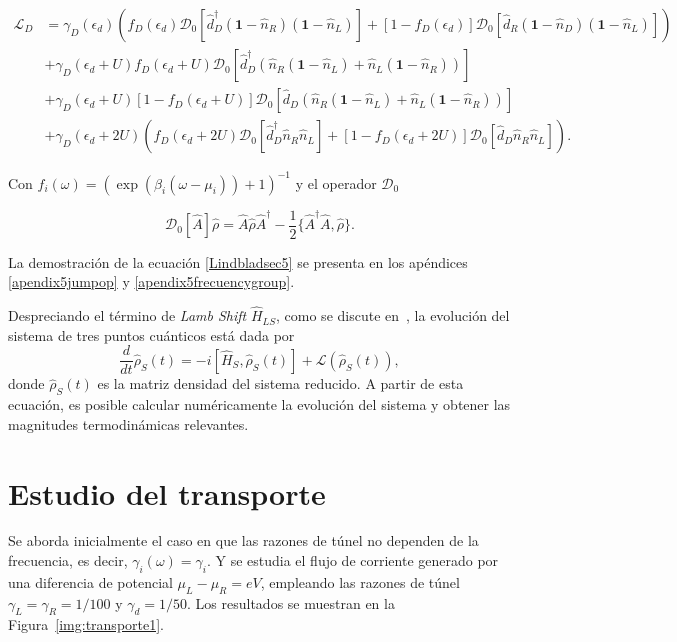 \begin{align*}
    \mathcal{L}_{D} & = \gamma_{D}(\epsilon_{d})(f_{D}(\epsilon_{d})\mathcal{D}_{0}[\hat{d}^{\dagger}_{D}(\textbf{1}-\hat{n}_{R})(\textbf{1}-\hat{n}_{L}) ]  + [1-f_{D}(\epsilon_{d})]\mathcal{D}_{0}[\hat{d}_{R}(\textbf{1}-\hat{n}_{D})(\textbf{1}-\hat{n}_{L}) ]  )  \\
                    & + \gamma_{D}(\epsilon_{d}+U)f_{D}(\epsilon_{d}+U)\mathcal{D}_{0}[\hat{d}^{\dagger}_{D}(\hat{n}_{R}(\textbf{1}-\hat{n}_{L}) + \hat{n}_{L}(\textbf{1}-\hat{n}_{R})) ]  \\
                    & + \gamma_{D}(\epsilon_{d}+U)[1-f_{D}(\epsilon_{d}+U)]\mathcal{D}_{0}[\hat{d}_{D}(\hat{n}_{R}(\textbf{1}-\hat{n}_{L}) + \hat{n}_{L}(\textbf{1}-\hat{n}_{R}))]   \\
                   & + \gamma_{D}(\epsilon_{d}+2U)(f_{D}(\epsilon_{d}+2U)\mathcal{D}_{0}[\hat{d}^{\dagger}_{D}\hat{n}_{R}\hat{n}_{L} ]  + [1-f_{D}(\epsilon_{d}+2U)]\mathcal{D}_{0}[\hat{d}_{D}\hat{n}_{R}\hat{n}_{L} ]  ).
\end{align*}

Con $f_{i}(\omega) = (\exp(\beta_{i}(\omega - \mu_{i})) + 1)^{-1}$ y el operador $\mathcal{D}_{0}$  

\begin{equation*}
    \mathcal{D}_{0}[\hat{A}]\hat{\rho} = \hat{A}\hat{\rho}\hat{A}^{\dagger}- \frac{1}{2} \{\hat{A }^{\dagger}\hat{A},\hat{\rho} \}.
\end{equation*}

La demostración de la ecuación \ref{Lindbladsec5} se presenta en los apéndices \ref{apendix5jumpop} y \ref{apendix5frecuencygroup}.

Despreciando el término de \textit{Lamb Shift} $\hat{H}_{LS}$, como se discute en~\cite{prech2023entanglement}, la evolución del sistema de tres puntos cuánticos está dada por
\begin{equation}
    \frac{d}{dt}\hat{\rho}_{S}(t) = -i[\hat{H}_{S},\hat{\rho}_{S}(t)] + \mathcal{L}(\hat{\rho}_{S}(t)),
\end{equation}
donde $\hat{\rho}_{S}(t)$ es la matriz densidad del sistema reducido. A partir de esta ecuación, es posible calcular numéricamente la evolución del sistema y obtener las magnitudes termodinámicas relevantes.

\label{sec5:modelo}

\newpage

\section{Estudio del transporte}
Se aborda inicialmente el caso en que las razones de túnel no dependen de la frecuencia, es decir, $\gamma_{i}(\omega) = \gamma_{i}$. Y se estudia el flujo de corriente generado por una diferencia de potencial $\mu_{L} - \mu_{R} = eV$, empleando las razones de túnel $\gamma_{L} = \gamma_{R} = 1/100$ y $\gamma_{d} = 1/50$. Los resultados se muestran en la Figura~\ref{img:transporte1}.

